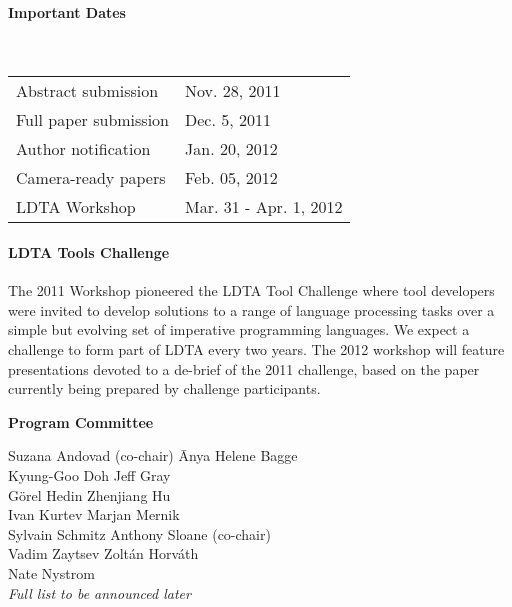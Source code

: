 \documentclass[letterpaper, twocolumn, 9pt]{article}
\begin{document}
\paragraph{\textsf{Important Dates}} ~

\vspace{5pt}
\hspace{-0.20in}
\begin{tabular}{ll}
Abstract submission & Nov. 28, 2011\\
Full paper submission & Dec. 5, 2011\\
Author notification & Jan. 20, 2012\\
Camera-ready papers & Feb. 05, 2012\\
LDTA Workshop & Mar. 31 - Apr. 1, 2012
\end{tabular}

\paragraph{\textsf{LDTA Tools Challenge}}
The 2011 Workshop pioneered the LDTA Tool Challenge where tool
developers were invited to develop solutions to a range of language
processing tasks over a simple but evolving set of imperative
programming languages. We expect a challenge to form part of LDTA
every two years. The 2012 workshop will feature presentations devoted
to a de-brief of the 2011 challenge, based on the paper currently
being prepared by challenge participants.

\newpage

\vspace{3pt}
\hspace{-0.20in}
{\bfseries\textsf{Program Committee}}\\
{\small
\vspace{-9pt}
\begin{tabbing}
 Suzana Andovad (co-chair) \hspace{1.25cm}\= Anya Helene Bagge\\
 Kyung-Goo Doh \> Jeff Gray\\
 Görel Hedin \> Zhenjiang Hu\\
 Ivan Kurtev \> Marjan Mernik\\
 Sylvain Schmitz \> Anthony Sloane (co-chair)\\
 Vadim Zaytsev \> Zoltán Horváth\\
 Nate Nystrom\\
 \emph{Full list to be announced later}\\
\end{tabbing}
}
\end{document}
